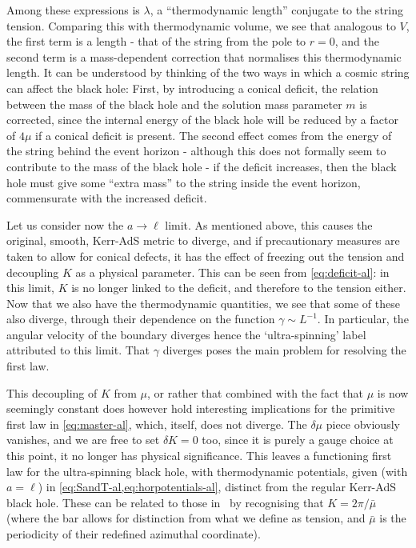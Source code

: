 \documentclass[
twoside,openright,frontopenright]{dmathesis}
\newcommand{\todoopt}[2][]{\todo[color=blue!20,size=\footnotesize,#1]{#2}}
\begin{document}
Among these expressions is $\lambda$, a ``thermodynamic length'' conjugate to
the string tension. \todoopt{this paragraph pasted from previous draft.}
Comparing this with thermodynamic volume, we see that analogous to $V$, the
first term is a length - that of the string from the pole to $r=0$, and the
second term is a mass-dependent correction that normalises this thermodynamic
length.  It can be understood by thinking of the two ways in which a cosmic
string can affect the black hole: First, by introducing a conical deficit, the
relation between the mass of the black hole and the solution mass parameter $m$
is corrected, since the internal energy of the black hole will be reduced by a
factor of $4\mu$ if a conical deficit is present.  The second effect comes from
the energy of the string behind the event horizon - although this does not
formally seem to contribute to the mass of the black hole - if the deficit
increases, then the black hole must give some ``extra mass'' to the string
inside the event horizon, commensurate with the increased deficit.

Let us consider now the $a\to\ell$ limit. As mentioned above, this causes the
original, smooth, Kerr-AdS metric to diverge, and if precautionary measures are
taken to allow for conical defects, it has the effect of freezing out the
tension and decoupling $K$ as a physical parameter. This can be seen from
\cref{eq:deficit-al}: in this limit, $K$ is no longer linked to the deficit, and
therefore to the tension either. Now that we also have the thermodynamic
quantities, we see that some of these also diverge, through their dependence on
the function $\gamma\sim L^{-1}$. In particular, the angular velocity of the
boundary diverges hence the `ultra-spinning' label attributed to this
limit. That $\gamma$ diverges poses the main problem for resolving the first
law.

This decoupling of $K$ from $\mu$, or rather that combined with the fact that
$\mu$ is now seemingly constant does however hold interesting implications for
the primitive first law in \cref{eq:master-al}, which, itself, does not
diverge. The $\delta \mu$ piece obviously vanishes, and we are free to set
$\delta K=0$ too, since it is purely a gauge choice at this point, it no longer
has physical significance. This leaves a functioning first law for the
ultra-spinning black hole, with thermodynamic potentials, given (with $a=\ell$)
in \cref{eq:SandT-al,eq:horpotentials-al}, distinct from the regular Kerr-AdS
black hole. These can be related to those
in~\cite{Hennigar:2014cfa,Hennigar:2015cja} by recognising that
$K=2\pi/\bar{\mu}$ (where the bar allows for distinction from what we define as
tension, and $\bar{\mu}$ is the periodicity of their redefined azimuthal
coordinate).
\end{document}
